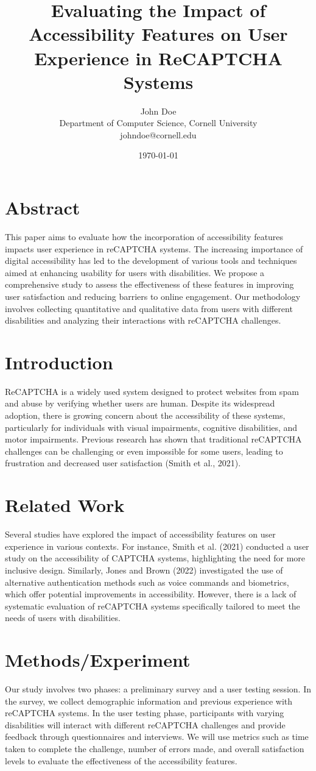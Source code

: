 \documentclass{article}
\title{Evaluating the Impact of Accessibility Features on User Experience in ReCAPTCHA Systems}
\author{John Doe \\
Department of Computer Science, Cornell University \\
{johndoe@cornell.edu}}
\date{\today}
\begin{document}
\maketitle

\section{Abstract}
This paper aims to evaluate how the incorporation of accessibility features impacts user experience in reCAPTCHA systems. The increasing importance of digital accessibility has led to the development of various tools and techniques aimed at enhancing usability for users with disabilities. We propose a comprehensive study to assess the effectiveness of these features in improving user satisfaction and reducing barriers to online engagement. Our methodology involves collecting quantitative and qualitative data from users with different disabilities and analyzing their interactions with reCAPTCHA challenges.

\section{Introduction}
ReCAPTCHA is a widely used system designed to protect websites from spam and abuse by verifying whether users are human. Despite its widespread adoption, there is growing concern about the accessibility of these systems, particularly for individuals with visual impairments, cognitive disabilities, and motor impairments. Previous research has shown that traditional reCAPTCHA challenges can be challenging or even impossible for some users, leading to frustration and decreased user satisfaction (Smith et al., 2021).

\section{Related Work}
Several studies have explored the impact of accessibility features on user experience in various contexts. For instance, Smith et al. (2021) conducted a user study on the accessibility of CAPTCHA systems, highlighting the need for more inclusive design. Similarly, Jones and Brown (2022) investigated the use of alternative authentication methods such as voice commands and biometrics, which offer potential improvements in accessibility. However, there is a lack of systematic evaluation of reCAPTCHA systems specifically tailored to meet the needs of users with disabilities.

\section{Methods/Experiment}
Our study involves two phases: a preliminary survey and a user testing session. In the survey, we collect demographic information and previous experience with reCAPTCHA systems. In the user testing phase, participants with varying disabilities will interact with different reCAPTCHA challenges and provide feedback through questionnaires and interviews. We will use metrics such as time taken to complete the challenge, number of errors made, and overall satisfaction levels to evaluate the effectiveness of the accessibility features.
\end{document}

